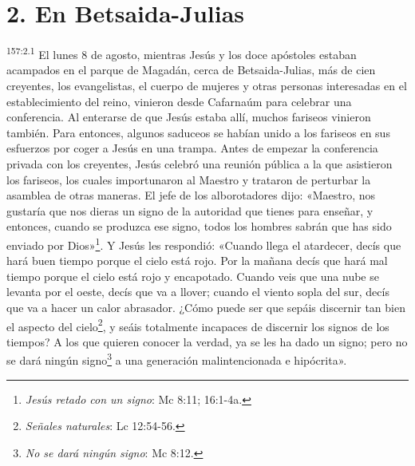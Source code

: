 \section*{2. En Betsaida-Julias}
\par
\textsuperscript{157:2.1} El lunes 8 de agosto, mientras Jesús y los doce apóstoles estaban acampados en el parque de Magadán, cerca de Betsaida-Julias, más de cien creyentes, los evangelistas, el cuerpo de mujeres y otras personas interesadas en el establecimiento del reino, vinieron desde Cafarnaúm para celebrar una conferencia. Al enterarse de que Jesús estaba allí, muchos fariseos vinieron también. Para entonces, algunos saduceos se habían unido a los fariseos en sus esfuerzos por coger a Jesús en una trampa. Antes de empezar la conferencia privada con los creyentes, Jesús celebró una reunión pública a la que asistieron los fariseos, los cuales importunaron al Maestro y trataron de perturbar la asamblea de otras maneras. El jefe de los alborotadores dijo: «Maestro, nos gustaría que nos dieras un signo de la autoridad que tienes para enseñar, y entonces, cuando se produzca ese signo, todos los hombres sabrán que has sido enviado por Dios»\footnote{\textit{Jesús retado con un signo}: Mc 8:11; 16:1-4a.}. Y Jesús les respondió: «Cuando llega el atardecer, decís que hará buen tiempo porque el cielo está rojo. Por la mañana decís que hará mal tiempo porque el cielo está rojo y encapotado. Cuando veis que una nube se levanta por el oeste, decís que va a llover; cuando el viento sopla del sur, decís que va a hacer un calor abrasador. ¿Cómo puede ser que sepáis discernir tan bien el aspecto del cielo\footnote{\textit{Señales naturales}: Lc 12:54-56.}, y seáis totalmente incapaces de discernir los signos de los tiempos? A los que quieren conocer la verdad, ya se les ha dado un signo; pero no se dará ningún signo\footnote{\textit{No se dará ningún signo}: Mc 8:12.} a una generación malintencionada e hipócrita».

